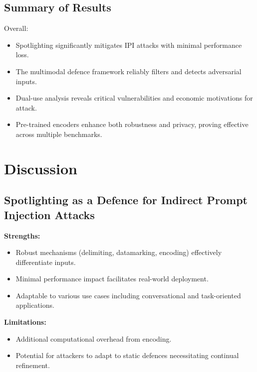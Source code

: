 \documentclass[journal]{IEEEtran}  %
\begin{document}
\subsection*{Summary of Results}
Overall:
\begin{itemize}
    \item Spotlighting significantly mitigates IPI attacks with minimal performance loss.
    \item The multimodal defence framework reliably filters and detects adversarial inputs.
    \item Dual-use analysis reveals critical vulnerabilities and economic motivations for attack.
    \item Pre-trained encoders enhance both robustness and privacy, proving effective across multiple benchmarks.
\end{itemize}

\section{Discussion}

\subsection{Spotlighting as a Defence for Indirect Prompt Injection Attacks}
\textbf{Strengths:}
\begin{itemize}
    \item Robust mechanisms (delimiting, datamarking, encoding) effectively differentiate inputs.
    \item Minimal performance impact facilitates real-world deployment.
    \item Adaptable to various use cases including conversational and task-oriented applications.
\end{itemize}
\textbf{Limitations:}
\begin{itemize}
    \item Additional computational overhead from encoding.
    \item Potential for attackers to adapt to static defences necessitating continual refinement.
\end{itemize}
\end{document}
